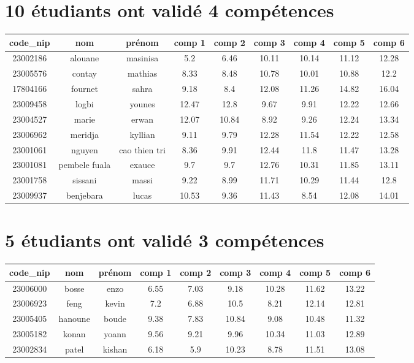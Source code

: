 \documentclass{article}%
\begin{document}
\section{10 étudiants ont validé 4 compétences}%
\label{sec:10tudiantsontvalid4comptences}%
\begin{tabular}{|c|c|c|c|c|c|c|c|c|}%
\hline%
\rowcolor{bleu}%
code\_nip&nom&prénom&comp 1&comp 2&comp 3&comp 4&comp 5&comp 6\\%
\hline%
23002186&alouane&masinisa&5.2&6.46&10.11&10.14&11.12&12.28\\%
\hline%
23005576&contay&mathias&8.33&8.48&10.78&10.01&10.88&12.2\\%
\hline%
17804166&fournet&sahra&9.18&8.4&12.08&11.26&14.82&16.04\\%
\hline%
23009458&logbi&younes&12.47&12.8&9.67&9.91&12.22&12.66\\%
\hline%
23004527&marie&erwan&12.07&10.84&8.92&9.26&12.24&13.34\\%
\hline%
23006962&meridja&kyllian&9.11&9.79&12.28&11.54&12.22&12.58\\%
\hline%
23001061&nguyen&cao thien tri&8.36&9.91&12.44&11.8&11.47&13.28\\%
\hline%
23001081&pembele fuala&exauce&9.7&9.7&12.76&10.31&11.85&13.11\\%
\hline%
23001758&sissani&massi&9.22&8.99&11.71&10.29&11.44&12.8\\%
\hline%
23009937&benjebara&lucas&10.53&9.36&11.43&8.54&12.08&14.01\\%
\hline%
\end{tabular}

%
\section{5 étudiants ont validé 3 compétences}%
\label{sec:5tudiantsontvalid3comptences}%
\begin{tabular}{|c|c|c|c|c|c|c|c|c|}%
\hline%
\rowcolor{bleu}%
code\_nip&nom&prénom&comp 1&comp 2&comp 3&comp 4&comp 5&comp 6\\%
\hline%
23006000&bosse&enzo&6.55&7.03&9.18&10.28&11.62&13.22\\%
\hline%
23006923&feng&kevin&7.2&6.88&10.5&8.21&12.14&12.81\\%
\hline%
23005405&hanoune&boude&9.38&7.83&10.84&9.08&10.48&11.32\\%
\hline%
23005182&konan&yoann&9.56&9.21&9.96&10.34&11.03&12.89\\%
\hline%
23002834&patel&kishan&6.18&5.9&10.23&8.78&11.51&13.08\\%
\hline%
\end{tabular}
\end{document}
